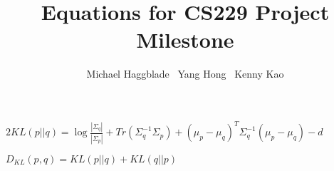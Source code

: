 \documentclass[landscape]{article}
\title{Equations for CS229 Project Milestone}
\author{Michael Haggblade \ Yang Hong \ Kenny Kao}
\begin{document}
\maketitle

$
2 KL(p||q) = \log \frac{|\Sigma_q|}{|\Sigma_p|} + Tr(\Sigma_q^{-1}\Sigma_p) +(\mu_p - \mu_q)^{T}\Sigma_q^{-1}(\mu_p - \mu_q) - d
$

\mbox{}
\mbox{}

$
D_{KL}(p,q) = KL(p||q) + KL(q||p)
$
\end{document}
